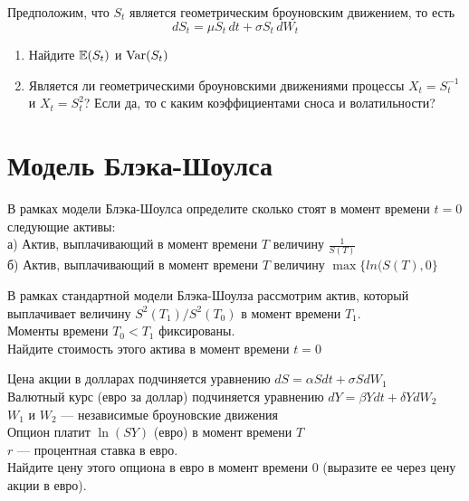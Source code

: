 \begin{problem}
Предположим, что $S_t$ является геометрическим броуновским движением, то есть
\[
dS_t = \mu S_t \, dt + \sigma S_t \, dW_t
\]


\begin{enumerate}
\item Найдите $\mathbb{E}(S_t)$ и $\operatorname{Var}(S_t)$
\item Является ли геометрическими броуновскими движениями процессы $X_t=S_t^{-1}$ и $X_t=S_t^{2}$? Если да, то с каким коэффициентами сноса и волатильности?
\end{enumerate}


\begin{sol}

\end{sol}
\end{problem}


\section{Модель Блэка-Шоулса}


\begin{problem}
В рамках модели Блэка-Шоулса определите сколько стоят в момент времени $t=0$ следующие активы: \\
а) Актив, выплачивающий в момент времени $T$ величину $\frac{1}{S(T)}$ \\
б) Актив, выплачивающий в момент времени $T$ величину $\max\{ln(S(T),0\}$

\begin{sol}

\end{sol}
\end{problem}

\begin{problem}
В рамках стандартной модели Блэка-Шоулза рассмотрим актив, который выплачивает величину $S^{2}(T_{1})/S^{2}(T_{0})$ в момент времени $T_{1}$. \\
Моменты времени $T_{0}<T_{1}$ фиксированы. \\
Найдите стоимость этого актива в момент времени $t=0$

\begin{sol}

\end{sol}
\end{problem}

\begin{problem}
Цена акции в долларах подчиняется уравнению $dS=\alpha Sdt+\sigma SdW_{1}$ \\
Валютный курс (евро за доллар) подчиняется уравнению $dY=\beta Ydt+\delta YdW_{2}$ \\
$W_{1}$ и $W_{2}$ — независимые броуновские движения \\
Опцион платит $\ln(SY)$ (евро) в момент времени $T$ \\
$r$ — процентная ставка в евро. \\
Найдите цену этого опциона в евро в момент времени $0$ (выразите ее через цену акции в евро).

\begin{sol}

\end{sol}
\end{problem}

